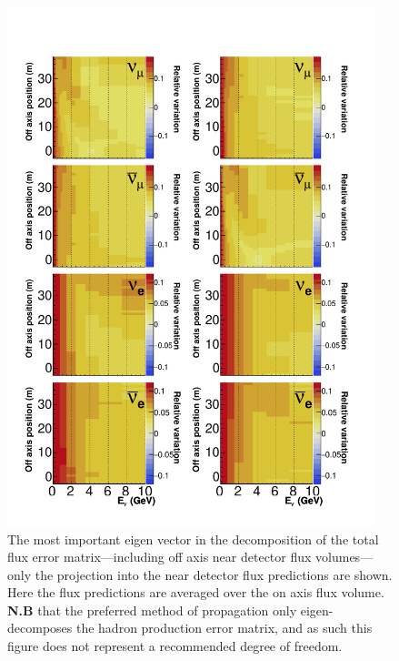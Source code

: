 \documentclass{article}
\begin{document}
\begin{figure}
  \centering
  \includegraphics[width=0.95\textwidth]{plots/EvUncerts_offaxis_component_0}
  \caption{The most important eigen vector in the decomposition of the total flux error matrix---including off axis near detector flux volumes---only the projection into the near detector flux predictions are shown. Here the flux predictions are averaged over the on axis flux volume. \textbf{N.B} that the preferred method of propagation only eigen-decomposes the hadron production error matrix, and as such this figure does not represent a recommended degree of freedom.}
  \label{fig:evfreedom_offaxis_c0}
\end{figure}
\end{document}
